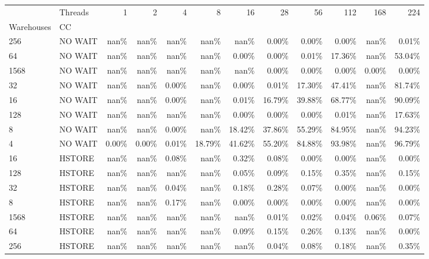 \begin{tabular}{llrrrrrrrrrr}
\toprule
     & Threads &   1   &   2   &   4   &    8   &    16  &    28  &    56  &    112 &   168 &    224 \\
Warehouses & CC &       &       &       &        &        &        &        &        &       &        \\
\midrule
256  & NO WAIT &  nan\% &  nan\% &  nan\% &   nan\% &   nan\% &  0.00\% &  0.00\% &  0.00\% &  nan\% &  0.01\% \\
64   & NO WAIT &  nan\% &  nan\% &  nan\% &   nan\% &  0.00\% &  0.00\% &  0.01\% & 17.36\% &  nan\% & 53.04\% \\
1568 & NO WAIT &  nan\% &  nan\% &  nan\% &   nan\% &   nan\% &  0.00\% &  0.00\% &  0.00\% & 0.00\% &  0.00\% \\
32   & NO WAIT &  nan\% &  nan\% & 0.00\% &   nan\% &  0.00\% &  0.01\% & 17.30\% & 47.41\% &  nan\% & 81.74\% \\
16   & NO WAIT &  nan\% &  nan\% & 0.00\% &   nan\% &  0.01\% & 16.79\% & 39.88\% & 68.77\% &  nan\% & 90.09\% \\
128  & NO WAIT &  nan\% &  nan\% &  nan\% &   nan\% &  0.00\% &  0.00\% &  0.00\% &  0.01\% &  nan\% & 17.63\% \\
8    & NO WAIT &  nan\% &  nan\% & 0.00\% &   nan\% & 18.42\% & 37.86\% & 55.29\% & 84.95\% &  nan\% & 94.23\% \\
4    & NO WAIT & 0.00\% & 0.00\% & 0.01\% & 18.79\% & 41.62\% & 55.20\% & 84.88\% & 93.98\% &  nan\% & 96.79\% \\
16   & HSTORE &  nan\% &  nan\% & 0.08\% &   nan\% &  0.32\% &  0.08\% &  0.00\% &  0.00\% &  nan\% &  0.00\% \\
128  & HSTORE &  nan\% &  nan\% &  nan\% &   nan\% &  0.05\% &  0.09\% &  0.15\% &  0.35\% &  nan\% &  0.15\% \\
32   & HSTORE &  nan\% &  nan\% & 0.04\% &   nan\% &  0.18\% &  0.28\% &  0.07\% &  0.00\% &  nan\% &  0.00\% \\
8    & HSTORE &  nan\% &  nan\% & 0.17\% &   nan\% &  0.00\% &  0.00\% &  0.00\% &  0.00\% &  nan\% &  0.00\% \\
1568 & HSTORE &  nan\% &  nan\% &  nan\% &   nan\% &   nan\% &  0.01\% &  0.02\% &  0.04\% & 0.06\% &  0.07\% \\
64   & HSTORE &  nan\% &  nan\% &  nan\% &   nan\% &  0.09\% &  0.15\% &  0.26\% &  0.13\% &  nan\% &  0.00\% \\
256  & HSTORE &  nan\% &  nan\% &  nan\% &   nan\% &   nan\% &  0.04\% &  0.08\% &  0.18\% &  nan\% &  0.35\% \\

\end{tabular}
